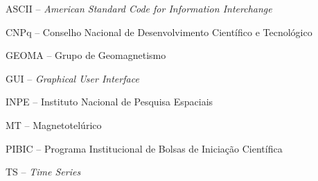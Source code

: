 \documentclass[12pt,twoside,oneright,a4paper,chapter=TITLE,english,brazil]{unipampa}
\newcommand{\en}[1]{\textit{#1}}
\begin{document}


\listoffigures      %


\begin{siglas}
    \item[ASCII --]            \en{American Standard Code for Information Interchange}
    \item[CNPq --]              Conselho Nacional de Desenvolvimento Científico e Tecnológico
    \item[GEOMA --]             Grupo de Geomagnetismo
    \item[GUI --]              \en{Graphical User Interface}
    \item[INPE --]              Instituto Nacional de Pesquisa Espaciais
    \item[MT --]               Magnetotelúrico
    \item[PIBIC --]             Programa Institucional de Bolsas de Iniciação Científica
    \item[TS --]               \en{Time Series}
\end{siglas}
\end{document}

